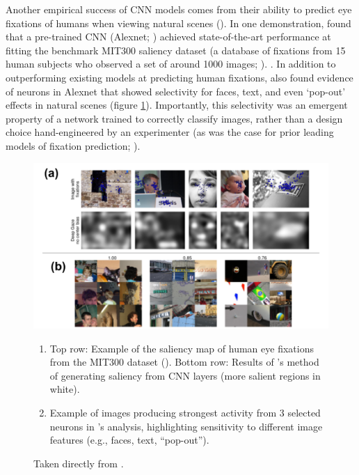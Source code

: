 \documentclass[12pt]{article}
\let\oldcite=\cite
\let\oldtextcite=\textcite
\renewcommand{\cite}[1]{\textcolor[rgb]{0, .121, .388}{\oldcite{#1}}}
\renewcommand{\textcite}[1]{\textcolor[rgb]{0, .121, .388}{\oldtextcite{#1}}}
\begin{document}
Another empirical success of CNN models comes from their ability to predict eye
fixations of humans when viewing natural scenes (\cite{vig2014large,kummerer2014deep}). In one demonstration, \textcite{kummerer2014deep} found that a pre-trained CNN (Alexnet; \cite{krizhevsky2012imagenet}) achieved state-of-the-art performance at fitting the benchmark MIT300 saliency dataset (a database of fixations from 15 human subjects who observed a set of around 1000 images; \cite{judd2009learning}). . In addition to outperforming existing models at predicting human fixations, \textcite{kummerer2014deep} also found evidence of neurons in Alexnet that showed selectivity for faces, text, and even `pop-out' effects in natural scenes (figure \ref{fig:kummerer2014}). Importantly, this selectivity was an emergent property of a network trained to correctly classify images, rather than a design choice hand-engineered by an experimenter (as was the case for prior leading models of fixation prediction; \cite{judd2009learning}).

\begin{figure}[!h]
    \centering
    \includegraphics[scale=.4]{figures/kummerer2014.png}
    \caption{}
        \begin{enumerate}[label=(\alph*)]
            \item Top row: Example of the saliency map of human eye fixations from the MIT300 dataset (\cite{judd2009learning}). Bottom row: Results of \textcite{kummerer2014deep}'s method of generating saliency from CNN layers (more salient regions in white). 
            \item Example of images producing strongest activity from 3 selected neurons in \textcite{kummerer2014deep}'s analysis, highlighting sensitivity to different image features (e.g., faces, text, ``pop-out''). 
        \end{enumerate}
    Taken directly from \textcite{kummerer2014deep}.
    \label{fig:kummerer2014}
\end{figure} 
\end{document}
